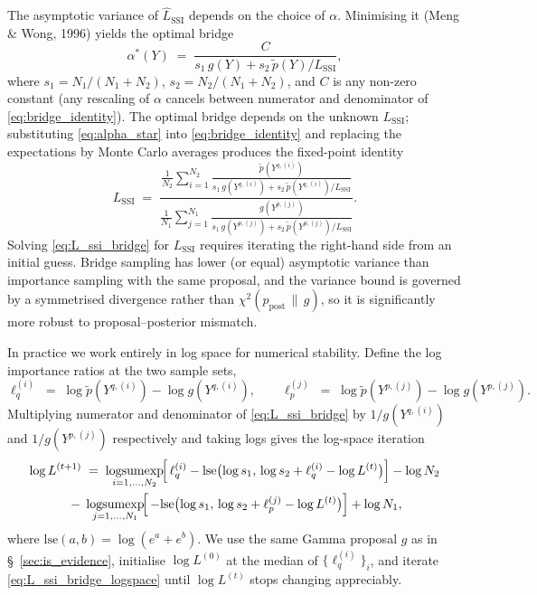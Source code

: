 \documentclass{article}
\theoremstyle{definition}
\begin{document}
The asymptotic variance of $\widehat L_\mathrm{SSI}$ depends on the
choice of $\alpha$.  Minimising it (Meng \& Wong, 1996) yields the
optimal bridge
\begin{equation}\label{eq:alpha_star}
  \alpha^*(Y)
  \;=\;
  \frac{C}{s_1\, g(Y) + s_2\, \tilde p(Y) / L_\mathrm{SSI}},
\end{equation}
where $s_1 = N_1/(N_1 + N_2)$, $s_2 = N_2/(N_1 + N_2)$, and $C$ is any
non-zero constant (any rescaling of $\alpha$ cancels between numerator
and denominator of \eqref{eq:bridge_identity}).  The optimal bridge
depends on the unknown $L_\mathrm{SSI}$; substituting
\eqref{eq:alpha_star} into \eqref{eq:bridge_identity} and replacing the
expectations by Monte Carlo averages produces the fixed-point identity
\begin{equation}\label{eq:L_ssi_bridge}
  L_\mathrm{SSI}
  \;=\;
  \frac{\displaystyle \frac{1}{N_2}\sum_{i=1}^{N_2}
    \frac{\tilde p(Y^{q,(i)})}{s_1\, g(Y^{q,(i)}) + s_2\, \tilde
  p(Y^{q,(i)})/L_\mathrm{SSI}}}
  {\displaystyle \frac{1}{N_1}\sum_{j=1}^{N_1}
    \frac{g(Y^{p,(j)})}{s_1\, g(Y^{p,(j)}) + s_2\, \tilde
  p(Y^{p,(j)})/L_\mathrm{SSI}}}.
\end{equation}
Solving \eqref{eq:L_ssi_bridge} for $L_\mathrm{SSI}$ requires iterating
the right-hand side from an initial guess.  Bridge sampling has lower
(or equal) asymptotic variance than importance sampling with the same
proposal, and the variance bound is governed by a symmetrised
divergence rather than $\chi^2(p_\mathrm{post} \,\|\, g)$, so it is
significantly more robust to proposal--posterior mismatch.

In practice we work entirely in log space for numerical stability.
Define the log importance ratios at the two sample sets,
\begin{equation*}
  \ell_q^{(i)} \;=\; \log \tilde p(Y^{q,(i)}) - \log g(Y^{q,(i)}),
  \qquad
  \ell_p^{(j)} \;=\; \log \tilde p(Y^{p,(j)}) - \log g(Y^{p,(j)}).
\end{equation*}
Multiplying numerator and denominator of \eqref{eq:L_ssi_bridge} by
$1/g(Y^{q,(i)})$ and $1/g(Y^{p,(j)})$ respectively and taking logs gives
the log-space iteration
\begin{multline}\label{eq:L_ssi_bridge_logspace}
  \log L^{(t+1)} \;=\;
  \operatornamewithlimits{logsumexp}_{i=1,\ldots,N_2}
  \!\Bigl[\,\ell_q^{(i)} -
    \mathrm{lse}\bigl(\log s_1,\, \log s_2 + \ell_q^{(i)} - \log
  L^{(t)}\bigr)\Bigr]
  - \log N_2 \\
  \;-\;
  \operatornamewithlimits{logsumexp}_{j=1,\ldots,N_1}
  \!\Bigl[\,-\mathrm{lse}\bigl(\log s_1,\, \log s_2 + \ell_p^{(j)} -
  \log L^{(t)}\bigr)\Bigr]
  + \log N_1,
\end{multline}
where $\mathrm{lse}(a,b) = \log(e^a + e^b)$.  We use the same Gamma
proposal $g$ as in \S~\ref{sec:is_evidence}, initialise $\log L^{(0)}$
at the median of $\{\ell_q^{(i)}\}_i$, and iterate
\eqref{eq:L_ssi_bridge_logspace} until $\log L^{(t)}$ stops changing
appreciably.
\end{document}
